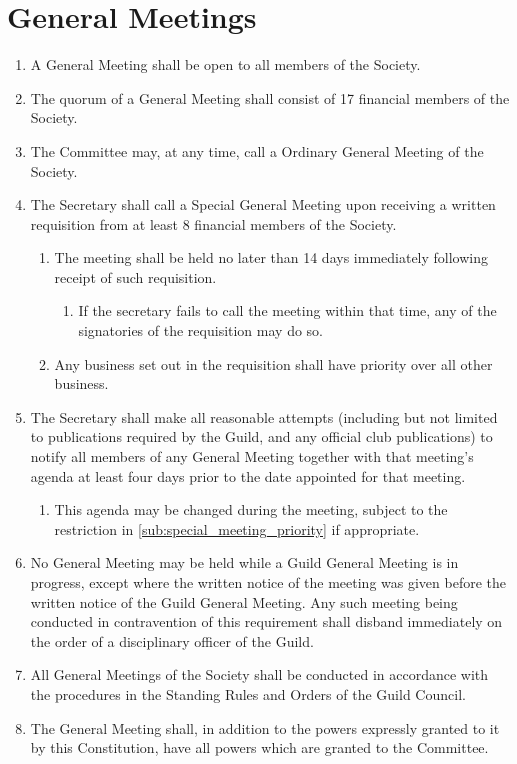 \documentclass[a4paper]{article}
\newenvironment{enumsection}[1]{\section{#1} \begin{enumerate}[ref=\thesection.\theenumi]}{\end{enumerate}}
\begin{document}
\begin{enumsection}{General Meetings} \label{sec:general_meetings}
	\item A General Meeting shall be open to all members of the Society.
	\item The quorum of a General Meeting shall consist of 17 financial members of the Society.
    \item The Committee may, at any time, call a Ordinary General Meeting of the Society.
    \item The Secretary shall call a Special General Meeting upon receiving a written requisition from at least 8 financial members of the Society.
    \begin{enumerate}
        \item The meeting shall be held no later than 14 days immediately following receipt of such requisition. 
        \begin{enumerate}
            \item If the secretary fails to call the meeting within that time, any of the signatories of the requisition may do so.
        \end{enumerate}
        \item \label{sub:special_meeting_priority} Any business set out in the requisition shall have priority over all other business. 
    \end{enumerate}
    \item The Secretary shall make all reasonable attempts (including but not limited to publications required by the Guild, and any official club publications) to notify all members of any General Meeting together with that meeting's agenda at least four days prior to the date appointed for that meeting.
    \begin{enumerate}
        \item This agenda may be changed during the meeting, subject to the restriction in \cref{sub:special_meeting_priority} if appropriate.
    \end{enumerate}
    \item No General Meeting may be held while a Guild General Meeting is in progress, except where the written notice of the meeting was given before the written notice of the Guild General Meeting. Any such meeting being conducted in contravention of this requirement shall disband immediately on the order of a disciplinary officer of the Guild.
    \item All General Meetings of the Society shall be conducted in accordance with the procedures in the Standing Rules and Orders of the Guild Council.
    \item The General Meeting shall, in addition to the powers expressly granted to it by this Constitution, have all powers which are granted to the Committee.
\end{enumsection}
\end{document}
